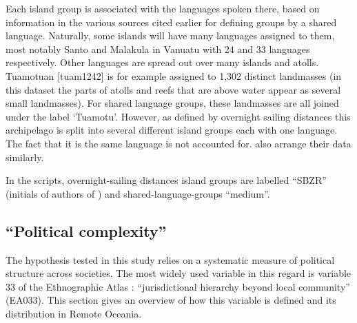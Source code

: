 \documentclass[12pt,letterpaper]{article}
\begin{document}

Each island group is associated with the languages spoken there, based on information in the various sources cited earlier for defining groups by a shared language. Naturally, some islands will have many languages assigned to them, most notably Santo and Malakula in Vanuatu with 24 and 33 languages respectively. Other languages are spread out over many islands and atolls. Tuamotuan [tuam1242] is for example assigned to 1,302 distinct landmasses (in this dataset the parts of atolls and reefs that are above water appear as several small landmasses). For shared language groups, these landmasses are all joined under the label `Tuamotu'. However, as defined by overnight sailing distances this archipelago is split into several different island groups each with one language. The fact that it is the same language is not accounted for. \citet{gavin2012island} also arrange their data similarly.

In the scripts, overnight-sailing distances island groups are labelled ``SBZR'' (initials of authors of \cite{NZSA_overnight_2023}) and shared-language-groups ``medium''.

\FloatBarrier
\subsection{``Political complexity''}
\label{appendix_def_pol_complex}
The hypothesis tested in this study relies on a systematic measure of political structure across societies. The most widely used variable in this regard is variable 33 of the Ethnographic Atlas \citep{EA_1971}: ``jurisdictional hierarchy beyond local community'' (EA033). This section gives an overview of how this variable is defined and its distribution in Remote Oceania. 
\end{document}
